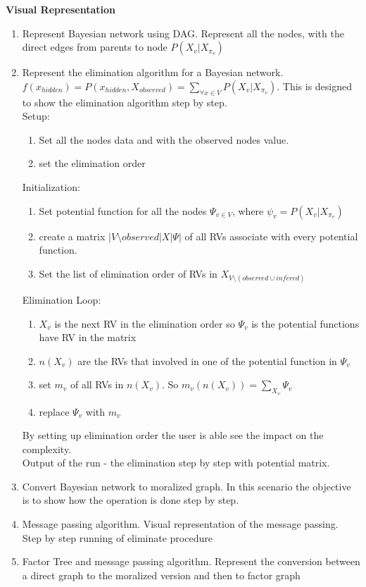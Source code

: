     \textbf{Visual Representation}\\
    \begin{enumerate}
        \item Represent Bayesian network using DAG. Represent all the nodes, with the direct edges from parents to node $P(X_v | X_{\pi_v})$
        \item Represent the elimination algorithm for a Bayesian network. $f(x_{hidden})=P(x_{hidden},X_{observed})=\sum_{\forall x \in V}P(X_v|X_{\pi_v})$. This is designed to show the elimination algorithm step by step.\\
        Setup:\\
        \begin{enumerate}
            \item Set all the nodes data and with the observed nodes value.
            \item set the elimination order
        \end{enumerate}
        Initialization:\\
        \begin{enumerate}
            \item Set potential function for all the nodes $\Psi_{v \in V}$, where $\psi_v = P(X_v|X_{\pi_v})$
            \item create a matrix $|V\setminus observed| X |\Psi|$ of all RVs associate with every potential function.
            \item Set the list of elimination order of RVs in $X_{V\setminus (observed \cup infered)}$
        \end{enumerate}
        Elimination Loop:\\
        \begin{enumerate}
            \item $X_v$ is the next RV in the elimination order so $\Psi_v$ is the potential functions have RV in the matrix
            \item $n(X_v)$ are the RVs that involved in one of the potential function in $\Psi_v$
            \item set $m_v$ of all RVs in $n(X_v)$. So $m_v(n(X_v))=\sum_{X_v}\Psi_v$
            \item replace $\Psi_v$ with $m_v$
        \end{enumerate}
        By setting up elimination order the user is able see the impact on the complexity.\\
        Output of the run - the elimination step by step with potential matrix.

        \item Convert Bayesian network to moralized graph. In this scenario the objective is to show how the operation is done step by step.

        \item Message passing algorithm. Visual representation of the message passing. Step by step running of eliminate procedure

        \item Factor Tree and message passing algorithm. Represent the conversion between a direct graph to the moralized version and then to factor graph
    \end{enumerate}

